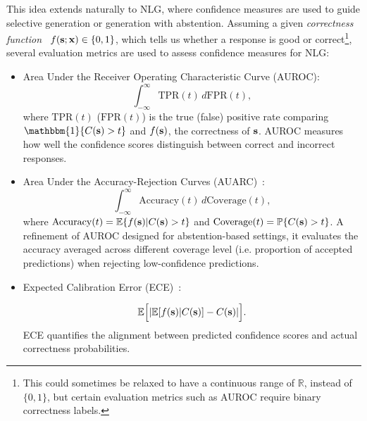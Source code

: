 This idea extends naturally to NLG, where confidence measures are used to guide selective generation or generation with abstention.
Assuming a given \textit{correctness function}~\cite{RCEhuang2024} $f(\mathbf{s};\mathbf{x})\in\{0,1\}$, which tells us whether a response is good or correct\footnote{This could sometimes be relaxed to have a continuous range of $\mathbb{R}$, instead of $\{0,1\}$, but certain evaluation metrics such as AUROC require binary correctness labels.}, several evaluation metrics are used to assess confidence measures for NLG:
\begin{itemize}[leftmargin=*, nosep]
    \item Area Under the Receiver Operating Characteristic Curve (AUROC): 
    \begin{equation}
        \int_{-\infty}^{\infty} \text{TPR}(t) \, d\text{FPR}(t),
    \end{equation}
    where $\text{TPR}(t)$ ($\text{FPR}(t)$) is the true (false) positive rate comparing $\mathbbm{1}\{C(\predSeq)>t\}$ and $f(\mathbf{s})$, the correctness of $\mathbf{s}$.
    AUROC measures how well the confidence scores distinguish between correct and incorrect responses.
    
    \item Area Under the Accuracy-Rejection Curves (AUARC)~\cite{auarc}: 
    \begin{equation}
        \int_{-\infty}^{\infty} \text{Accuracy}(t) \, d\text{Coverage}(t),
    \end{equation}
    where $\text{Accuracy}(t)=\mathbb{E}\{f(\mathbf{s})|C(\mathbf{s})>t\}$ and $\text{Coverage}(t) = \mathbb{P}\{C(\mathbf{s})>t\}$.
    A refinement of AUROC designed for abstention-based settings, it evaluates the accuracy averaged across different coverage level (i.e. proportion of accepted predictions) when rejecting low-confidence predictions.
    
    \item Expected Calibration Error (ECE)~\cite{ICML2017_Guo}: 
    
    \begin{equation}
        \mathbb{E}\Big[|\mathbb{E}[f(\mathbf{s})|C(\mathbf{s})] - C(\mathbf{s})|\Big].
    \end{equation}
    ECE quantifies the alignment between predicted confidence scores and actual correctness probabilities. 
    


\end{itemize}
